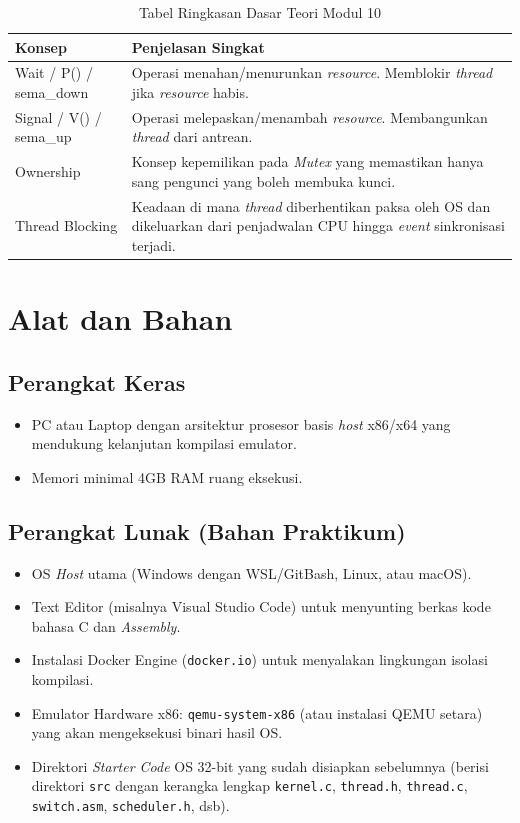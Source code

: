 \begin{table}[h]
	\caption{Tabel Ringkasan Dasar Teori Modul 10}
	\label{tab:m10-dasar-teori}
	\centering
	\begin{tabulary}{\textwidth}{|L|L|}
		\hline
		\textbf{Konsep} & \textbf{Penjelasan Singkat} \\ \hline
		Wait / P() / sema\_down
		& Operasi menahan/menurunkan \textit{resource}. Memblokir \textit{thread} jika \textit{resource} habis. \\ \hline
		Signal / V() / sema\_up
		& Operasi melepaskan/menambah \textit{resource}. Membangunkan \textit{thread} dari antrean. \\ \hline
		Ownership
		& Konsep kepemilikan pada \textit{Mutex} yang memastikan hanya sang pengunci yang boleh membuka kunci. \\ \hline
		Thread Blocking
		& Keadaan di mana \textit{thread} diberhentikan paksa oleh OS dan dikeluarkan dari penjadwalan CPU hingga \textit{event} sinkronisasi terjadi. \\ \hline
	\end{tabulary}
\end{table}


\newpage
\section{Alat dan Bahan}
\label{sec:m10-alat-bahan}

\subsection{Perangkat Keras}
\begin{itemize}
	\item PC atau Laptop dengan arsitektur prosesor basis \textit{host} x86/x64 yang mendukung kelanjutan kompilasi emulator.
	\item Memori minimal 4GB RAM ruang eksekusi.
\end{itemize}

\subsection{Perangkat Lunak (Bahan Praktikum)}
\begin{itemize}
	\item OS \textit{Host} utama (Windows dengan WSL/GitBash, Linux, atau macOS).
	\item Text Editor (misalnya Visual Studio Code) untuk menyunting berkas kode bahasa C dan \textit{Assembly}.
	\item Instalasi Docker Engine (\texttt{docker.io}) untuk menyalakan lingkungan isolasi kompilasi.
	\item Emulator Hardware x86: \texttt{qemu-system-x86} (atau instalasi QEMU setara) yang akan mengeksekusi binari hasil OS.
	\item Direktori \textit{Starter Code} OS 32-bit yang sudah disiapkan sebelumnya (berisi direktori \texttt{src} dengan kerangka lengkap \texttt{kernel.c}, \texttt{thread.h}, \texttt{thread.c}, \texttt{switch.asm}, \texttt{scheduler.h}, dsb).
\end{itemize}

